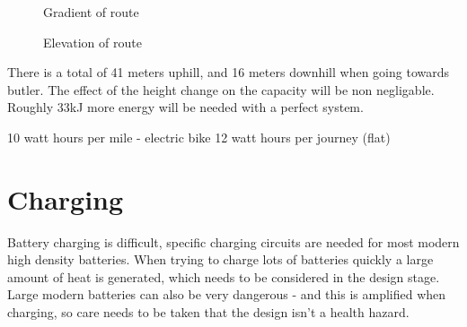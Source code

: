 \documentclass{article}
\begin{document}
\begin{figure}[H]
    \centering
    \caption{Gradient of route}
    \label{fig:route_el}
\end{figure}
\begin{figure}[H]
    \centering
    \caption{Elevation of route}
    \label{fig:route_grad}
\end{figure}
There is a total of 41 meters uphill, and 16 meters downhill when going towards butler.
The effect of the height change on the capacity will be non negligable.
Roughly 33kJ more energy will be needed with a perfect system.

10 watt hours per mile - electric bike
12 watt hours per journey (flat)
\section{Charging}
Battery charging is difficult, specific charging circuits are needed for most modern high density batteries.
When trying to charge lots of batteries quickly a large amount of heat is generated, which needs to be considered in the design stage.
Large modern batteries can also be very dangerous - and this is amplified when charging, so care needs to be taken that the design isn't a health hazard.
\end{document}
